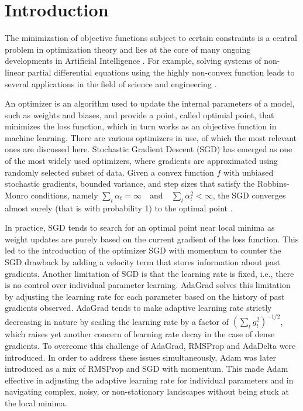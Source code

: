 \documentclass[12pt]{article}
\begin{document}
  

\section{Introduction}\label{introduction}
The minimization of objective functions subject to certain constraints is a central problem in optimization theory and lies at the core of many ongoing developments in Artificial Intelligence \cite{avramelou2025sign, wu2026convolutional, das2026meaning}. For example, solving systems of non-linear partial differential equations using the highly non-convex function leads to several applications in the field of science and engineering \cite{yu2022gradient}.

An optimizer is an algorithm used to update the internal parameters of a model, such as weights and biases, and provide a point, called optimial point, that minimizes the loss function, which in turn works as an objective function in machine learning. There are various optimizers in use, of which the most relevant ones are discussed here. Stochastic Gradient Descent (SGD) has emerged as one of the most widely used optimizers, where gradients are approximated using randomly selected subset of data. Given a convex function $f$ with unbiased stochastic gradients, bounded variance, and step sizes that satisfy the Robbins-Monro conditions, namely $\sum_{t} \alpha_t = \infty \quad \text{and} \quad \sum_{t} \alpha_t^2 < \infty$, the SGD converges almost surely (that is with probability 1) to the optimal point \cite{NguyenNguyenRichtarikScheinbergTakacVanDijk2019, liu2023aiming}.

In practice, SGD tends to search for an optimal point near local minima as weight updates are purely based on the current gradient of the loss function. This led to the introduction of the optimizer SGD with momentum to counter the SGD drawback by adding a velocity term that stores information about past gradients. Another limitation of SGD is that the learning rate is fixed, i.e., there is no control over individual parameter learning. AdaGrad \cite{DuchiHazanSinger2011} solves this limitation by adjusting the learning rate for each parameter based on the history of past gradients observed. AdaGrad tends to make adaptive learning rate strictly decreasing in nature by scaling the learning rate by a factor of $(\sum_{t} g_t^2)^{-1/2}$, which raises yet another concern of learning rate decay in the case of dense gradients. To overcome this challenge of AdaGrad, RMSProp \cite{TielemanHinton2012} and AdaDelta \cite{zeiler2012} were introduced. In order to address these issues simultaneously, Adam \cite{KingmaBa2014} was later introduced as a mix of RMSProp and SGD with momentum. 
This made Adam effective in adjusting the adaptive learning rate for individual parameters and in navigating complex, noisy, or non-stationary landscapes without being stuck at the local minima.
\end{document}

